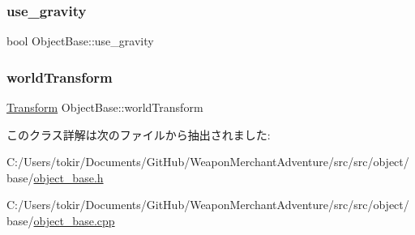 \subsubsection{\texorpdfstring{use\+\_\+gravity}{use\_gravity}}
{\footnotesize\ttfamily bool Object\+Base\+::use\+\_\+gravity}

\mbox{\label{class_object_base_abedc2ea4baa694611f8822ea6e04b210}} 
\subsubsection{\texorpdfstring{world\+Transform}{worldTransform}}
{\footnotesize\ttfamily \mbox{\hyperlink{common_8h_a1c43cb8f0d8a41901f3ce4c67dbbce20}{Transform}} Object\+Base\+::world\+Transform\hspace{0.3cm}{\ttfamily [protected]}}



このクラス詳解は次のファイルから抽出されました\+:\begin{DoxyCompactItemize}
\item 
C\+:/\+Users/tokir/\+Documents/\+Git\+Hub/\+Weapon\+Merchant\+Adventure/src/src/object/base/\mbox{\hyperlink{object__base_8h}{object\+\_\+base.\+h}}\item 
C\+:/\+Users/tokir/\+Documents/\+Git\+Hub/\+Weapon\+Merchant\+Adventure/src/src/object/base/\mbox{\hyperlink{object__base_8cpp}{object\+\_\+base.\+cpp}}\end{DoxyCompactItemize}
